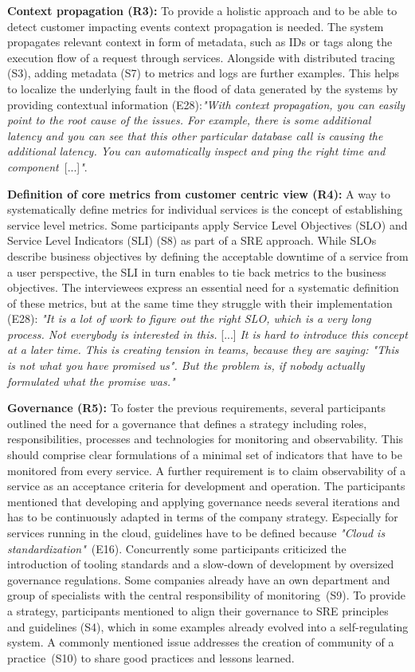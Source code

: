 \documentclass[runningheads]{llncs}
\begin{document}
\textbf{Context propagation (R3):} To provide a holistic approach and to be able to detect customer impacting events context propagation is needed. The system propagates relevant context in form of metadata, such as IDs or tags along the execution flow of a request through services. Alongside with distributed tracing (S3), adding metadata (S7) to metrics and logs are further examples. This helps to localize the underlying fault in the flood of data generated by the systems by providing contextual information (E28):\textit{"With context propagation, you can easily point to the root cause of the issues. For example, there is some additional latency and you can see that this other particular database call is causing the additional latency. You can automatically inspect and ping the right time and component}~[...]\textit{"}.

\textbf{Definition of core metrics from customer centric view (R4):}
A way to systematically define metrics for individual services is the concept of establishing service level metrics. Some participants apply Service Level Objectives (SLO) and Service Level Indicators (SLI) (S8) as part of a SRE approach. While SLOs describe business objectives by defining the acceptable downtime of a service from a user perspective, the SLI in turn enables to tie back metrics to the business objectives. The interviewees express an essential need for a systematic definition of these metrics, but at the same time they struggle with their implementation (E28): \textit{"It is a lot of work to figure out the right SLO, which is a very long process. Not everybody is interested in this.} [...] \textit{It is hard to introduce this concept at a later time. This is  creating tension in teams, because they are saying: "This is not what you have promised us". But the problem is, if nobody actually formulated what the promise was."}

\textbf{Governance (R5):} To foster the previous requirements, several participants outlined the need for a governance that defines a strategy including roles, responsibilities, processes and technologies for monitoring and observability. This should comprise clear formulations of a minimal set of indicators that have to be monitored from every service. A further requirement is to claim observability of a service as an acceptance criteria for development and operation. The participants mentioned that developing and applying governance needs several iterations and has to be continuously adapted in terms of the company strategy. Especially for services running in the cloud, guidelines have to be defined because \textit{"Cloud is standardization"}~(E16). Concurrently some participants criticized the introduction of tooling standards and a slow-down of development by oversized governance regulations. Some companies already have an own department and group of specialists with the central responsibility of monitoring~(S9). To provide a strategy, participants mentioned to align their governance to SRE principles and guidelines (S4), which in some examples already evolved into a self-regulating system. A commonly mentioned issue addresses the creation of community of a practice~(S10) to share good practices and lessons learned.
\end{document}
